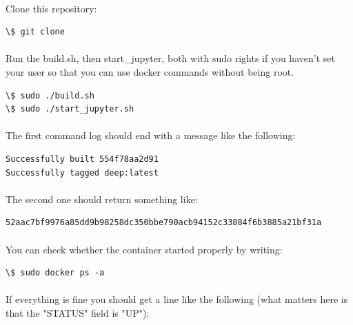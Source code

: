\documentclass[french]{article}
\begin{document}
\paragraph{} Clone this repository:

\begin{verbatim}
\$ git clone
\end{verbatim}

\paragraph{} Run the build.sh, then start\_jupyter, both with sudo rights if you haven't set your user so that you can use docker commands without being root.

\begin{verbatim}
\$ sudo ./build.sh
\$ sudo ./start_jupyter.sh
\end{verbatim}

\paragraph{} The first command log should end with a message like the following:

\begin{verbatim}
Successfully built 554f78aa2d91
Successfully tagged deep:latest
\end{verbatim}

\paragraph{} The second one should return something like:

\begin{verbatim}
52aac7bf9976a85dd9b98258dc350bbe790acb94152c33884f6b3885a21bf31a
\end{verbatim}

\paragraph{} You can check whether the container started properly by writing:

\begin{verbatim}
\$ sudo docker ps -a
\end{verbatim}

\paragraph{} If everything is fine you should get a line like the following (what matters here is that the "STATUS" field is "UP"):
\end{document}
